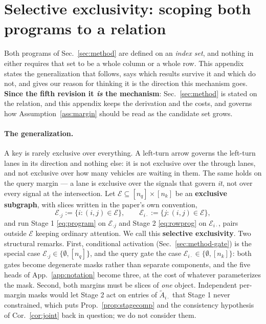 \documentclass{article}
\begin{document}
\section{Selective exclusivity: scoping both programs to a relation}
\label{app:selective}

Both programs of Sec.~\ref{sec:method} are defined on an \emph{index set}, and nothing in either
requires that set to be a whole column or a whole row. This appendix states the generalization
that follows, says which results survive it and which do not, and gives our reason for thinking
it is the direction this mechanism goes. \textbf{Since the fifth revision it \emph{is} the
mechanism}: Sec.~\ref{sec:method} is stated on the relation, and this appendix keeps the
derivation and the costs, and governs how Assumption~\ref{ass:margin} should be read as the
candidate set grows.

\paragraph{The generalization.} A key is rarely exclusive over everything. A left-turn arrow
governs the left-turn lanes in its direction and nothing else: it is not exclusive over the
through lanes, and not exclusive over how many vehicles are waiting in them. The same holds on
the query margin --- a lane is exclusive over the signals that govern \emph{it}, not over every
signal at the intersection. Let $\mathcal{E}\subseteq[n_q]\times[n_k]$ be an \textbf{exclusive
subgraph}, with slices written in the paper's own convention,
\begin{equation}
\mathcal{E}_{\cdot j} := \{i : (i,j)\in\mathcal{E}\},
\qquad
\mathcal{E}_{i\cdot} := \{j : (i,j)\in\mathcal{E}\},
\label{eq:subgraph}
\end{equation}
and run Stage 1 \eqref{eq:program} on $\mathcal{E}_{\cdot j}$ and Stage 2 \eqref{eq:rowprog} on
$\mathcal{E}_{i\cdot}$, pairs outside $\mathcal{E}$ keeping ordinary attention. We call this
\textbf{selective exclusivity}. Two structural remarks. First, conditional activation
(Sec.~\ref{sec:method-gate}) is the special case
$\mathcal{E}_{\cdot j}\in\{\emptyset,[n_q]\}$, and the query gate the case
$\mathcal{E}_{i\cdot}\in\{\emptyset,[n_k]\}$: both gates become degenerate masks rather than
separate components, and the five heads of App.~\ref{app:notation} become three, at the cost of
whatever parameterizes the mask. Second, both
margins must be slices of \emph{one} object. Independent per-margin masks would let Stage 2 act
on entries of $\tilde A_{i\cdot}$ that Stage 1 never constrained, which puts
Prop.~\ref{prop:stagecomp} and the consistency hypothesis of Cor.~\ref{cor:joint} back in
question; we do not consider them.
\end{document}

